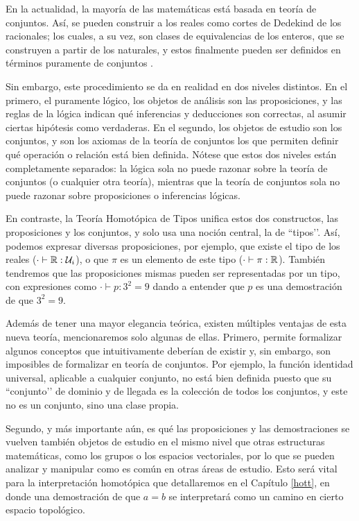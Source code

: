 \documentclass[../main.tex]{subfiles}
\begin{document}
En la actualidad, la mayoría de las matemáticas está basada en teoría de conjuntos.
Así, se pueden construir a los reales como cortes de Dedekind de los racionales; los cuales, a su vez, son clases de equivalencias de los enteros, que se construyen a partir de los naturales, y estos finalmente pueden ser definidos en términos puramente de conjuntos \cite{enderton_elements_1977}.

Sin embargo, este procedimiento se da en realidad en dos niveles distintos.
En el primero, el puramente lógico, los objetos de análisis son las proposiciones, y las reglas de la lógica indican qué inferencias y deducciones son correctas, al asumir ciertas hipótesis como verdaderas.
En el segundo, los objetos de estudio son los conjuntos, y son los axiomas de la teoría de conjuntos los que permiten definir qué operación o relación está bien definida.
Nótese que estos dos niveles están completamente separados: la lógica sola no puede razonar sobre la teoría de conjuntos (o cualquier otra teoría), mientras que la teoría de conjuntos sola no puede razonar sobre proposiciones o inferencias lógicas.

En contraste, la Teoría Homot\'opica de Tipos unifica estos dos constructos, las proposiciones y los conjuntos, y solo usa una noción central, la de ``tipos’’.
Así, podemos expresar diversas proposiciones, por ejemplo, que existe el tipo de los reales ($\cdot \vdash \mathbb{R} : \mathcal U_i$), o que $\pi$ es un elemento de este tipo ($\cdot \vdash \pi :\mathbb{R}$).
También tendremos que las proposiciones mismas pueden ser representadas por un tipo, con expresiones como $\cdot \vdash p : 3^2=9$ dando a entender que $p$ es una demostración de que $3^2=9$.

Además de tener una mayor elegancia teórica, existen múltiples ventajas de esta nueva teoría, mencionaremos solo algunas de ellas. Primero, permite formalizar algunos conceptos que intuitivamente deberían de existir y, sin embargo, son imposibles de formalizar en teoría de conjuntos.
Por ejemplo, la función identidad universal, aplicable a cualquier conjunto, no está bien definida puesto que su ``conjunto’’ de dominio y de llegada es la colección de todos los conjuntos, y este no es un conjunto, sino una clase propia.

Segundo, y más importante aún, es qué las proposiciones y las demostraciones se vuelven también objetos de estudio en el mismo nivel que otras estructuras matemáticas, como los grupos o los espacios vectoriales, por lo que se pueden analizar y manipular como es común en otras áreas de estudio.
Esto será vital para la interpretación homotópica que detallaremos en el Cap\'itulo \ref{hott}, en donde una demostración de que $a=b$ se interpretará como un camino en cierto espacio topológico.
\end{document}
